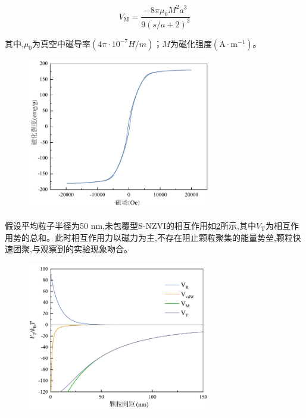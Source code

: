 \begin{equation}
    V_\mathrm{M}=\frac{-8\pi \mu _0M^2a^3}{9(s/a+2)^3}
    \label{VM}
\end{equation}

其中,$\mu_0$为真空中磁导率$(4\pi\cdot10^{-7}H/m )$；$M$为磁化强度$(\mathrm{A\cdot m^{-1}})$。

\begin{figure}
    \centering
    \includegraphics[width=8cm]{figs/fig6.pdf}
    \label{fig6}
\end{figure}

假设平均粒子半径为50 nm,未包覆型S-NZVI的相互作用如\cref{fig7}所示,其中$V_\mathrm{T}$为相互作用势的总和。此时相互作用力以磁力为主,不存在阻止颗粒聚集的能量势垒,颗粒快速团聚,与观察到的实验现象吻合。

\begin{figure}[h]
    \centering
    \includegraphics[width=8cm]{figs/fig7.pdf}
    \label{fig7}
\end{figure}


